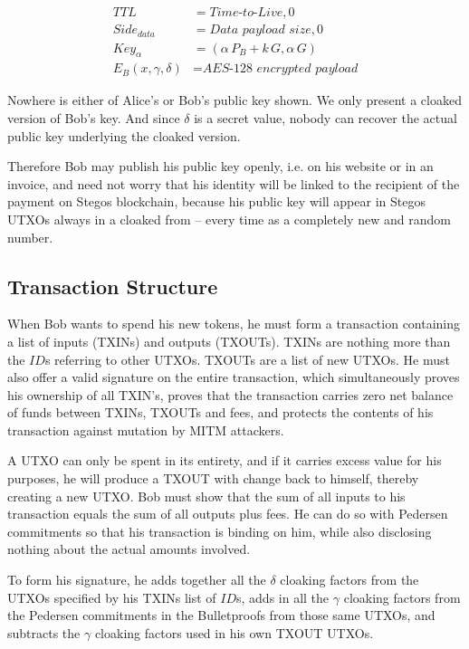 \documentclass[a4paper, 10pt, conference]{ieeeconf}
\begin{document}
\begin{align*}
TTL &= \textit{Time-to-Live}, 0 \\
Side_{data} &= \textit{Data payload size}, 0 \\
Key_{\alpha} &= (\alpha \, P_{B} + k \, G, \alpha \, G ) \\
E_B(x, \gamma, \delta) &= \textit{AES-128 encrypted payload}
\end{align*}

Nowhere is either of Alice's or Bob's public key shown. We only present a cloaked version of Bob's key. And since $\delta$ is a secret value, nobody can recover the actual public key underlying the cloaked version. 

Therefore Bob may publish his public key openly, i.e. on his website or in an invoice, and need not worry that his identity will be linked to the recipient of the payment on Stegos blockchain, because his public key will appear in Stegos UTXOs always in a cloaked from -- every time as a completely new and random number.

\subsection{Transaction Structure}

When Bob wants to spend his new tokens, he must form a transaction containing a list of inputs (TXINs) and outputs (TXOUTs). TXINs are nothing more than the $\mathit{ID}$s referring to other UTXOs. TXOUTs are a list of new UTXOs. He must also offer a valid signature on the entire transaction, which simultaneously proves his ownership of all TXIN's, proves that the transaction carries zero net balance of funds between TXINs, TXOUTs and fees, and protects the contents of his transaction against mutation by MITM attackers.

A UTXO can only be spent in its entirety, and if it carries excess value for his purposes, he will produce a TXOUT with change back to himself, thereby creating a new UTXO. Bob must show that the sum of all inputs to his transaction equals the sum of all outputs plus fees. He can do so with Pedersen commitments so that his transaction is binding on him, while also disclosing nothing about the actual amounts involved.

To form his signature, he adds together all the $\delta$ cloaking factors from the UTXOs specified by his TXINs list of $\mathit{ID}$s, adds in all the $\gamma$ cloaking factors from the Pedersen commitments in the Bulletproofs from those same UTXOs, and subtracts the $\gamma$ cloaking factors used in his own TXOUT UTXOs. 
\end{document}
